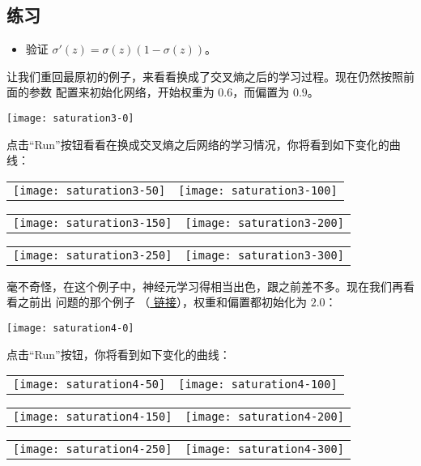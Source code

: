 \subsection*{练习}

\begin{itemize}
\item 验证 $\sigma'(z) = \sigma(z)(1-\sigma(z))$。
\end{itemize}

让我们重回最原初的例子，来看看换成了交叉熵之后的学习过程。现在仍然按照前面的参数
配置来初始化网络，开始权重为 $0.6$，而偏置为 $0.9$。
\begin{center}
  \texttt{[image: saturation3-0]}
\end{center}
点击“Run”按钮看看在换成交叉熵之后网络的学习情况，你将看到如下变化的曲线：
\begin{center}
  \begin{tabular}{ll}
    \texttt{[image: saturation3-50]} & \texttt{[image: saturation3-100]}\\
  \end{tabular}
  \begin{tabular}{ll}
    \texttt{[image: saturation3-150]} & \texttt{[image: saturation3-200]}\\
  \end{tabular}
  \begin{tabular}{ll}
    \texttt{[image: saturation3-250]} & \texttt{[image: saturation3-300]}
  \end{tabular}
\end{center}

毫不奇怪，在这个例子中，神经元学习得相当出色，跟之前差不多。现在我们再看看之前出
问题的那个例子
（\href{http://neuralnetworksanddeeplearning.com/chap3.html#saturation2_anchor}{
  链接}），权重和偏置都初始化为 $2.0$：
\begin{center}
  \texttt{[image: saturation4-0]}
\end{center}
点击“Run”按钮，你将看到如下变化的曲线：
\begin{center}
  \begin{tabular}{ll}
    \texttt{[image: saturation4-50]} & \texttt{[image: saturation4-100]}\\
  \end{tabular}
  \begin{tabular}{ll}
    \texttt{[image: saturation4-150]} & \texttt{[image: saturation4-200]}\\
  \end{tabular}
  \begin{tabular}{ll}
    \texttt{[image: saturation4-250]} & \texttt{[image: saturation4-300]}
  \end{tabular}
\end{center}

